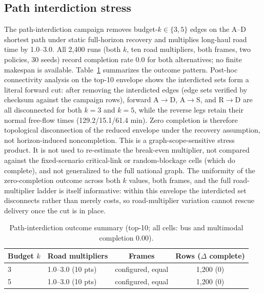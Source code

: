 \documentclass{ieeeaccess}
\begin{document}
\subsection{Path interdiction stress}
The path-interdiction campaign removes budget-$k\in\{3,5\}$ edges on the A--D shortest path under static full-horizon recovery and multiplies long-haul road time by 1.0--3.0. All 2{,}400 runs (both $k$, ten road multipliers, both frames, two policies, 30 seeds) record completion rate 0.0 for both alternatives; no finite makespan is available. Table~\ref{tab:path} summarizes the outcome pattern. Post-hoc connectivity analysis on the top-10 envelope shows the interdicted sets form a literal forward cut: after removing the interdicted edges (edge sets verified by checksum against the campaign rows), forward A$\rightarrow$D, A$\rightarrow$S, and R$\rightarrow$D are all disconnected for both $k=3$ and $k=5$, while the reverse legs retain their normal free-flow times (129.2/15.1/61.4 min). Zero completion is therefore topological disconnection of the reduced envelope under the recovery assumption, not horizon-induced noncompletion. This is a graph-scope-sensitive stress product. It is not used to re-estimate the break-even multiplier, not compared against the fixed-scenario critical-link or random-blockage cells (which do complete), and not generalized to the full national graph. The uniformity of the zero-completion outcome across both $k$ values, both frames, and the full road-multiplier ladder is itself informative: within this envelope the interdicted set disconnects rather than merely costs, so road-multiplier variation cannot rescue delivery once the cut is in place.

\begin{table}[!t]
\caption{Path-interdiction outcome summary (top-10; all cells: bus and multimodal completion 0.00).}
\label{tab:path}
\centering
\footnotesize
\begin{tabular}{@{}llcc@{}}
\hline
Budget $k$ & Road multipliers & Frames & Rows ($\Delta$ complete) \\
\hline
3 & 1.0--3.0 (10 pts) & configured, equal & 1{,}200 (0) \\
5 & 1.0--3.0 (10 pts) & configured, equal & 1{,}200 (0) \\
\hline
\end{tabular}
\end{table}
\end{document}
